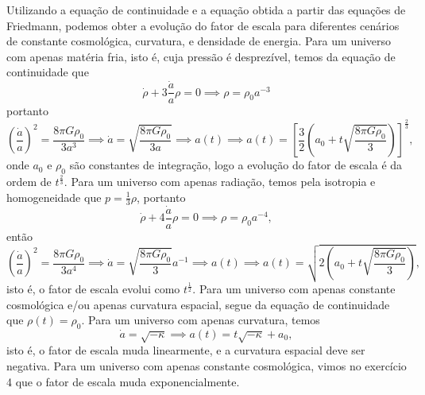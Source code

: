 Utilizando a equação de continuidade e a equação obtida a partir das equações de Friedmann, podemos obter a evolução do fator de escala para diferentes cenários de constante cosmológica, curvatura, e densidade de energia. Para um universo com apenas matéria fria, isto é, cuja pressão é desprezível, temos da equação de continuidade que
\begin{equation*}
    \dot{\rho} + 3\frac{\dot{a}}{a} \rho = 0 \implies \rho = \rho_0 a^{-3}
\end{equation*}
portanto
\begin{equation*}
    \left(\frac{\dot{a}}{a}\right)^2 = \frac{8\pi G\rho_0}{3a^3} \implies \dot{a} = \sqrt{\frac{8\pi G \rho_0}{3a}} \implies a(t) \implies a(t) = \left[\frac32 \left(a_0 + t\sqrt{\frac{8\pi G\rho_0}{3}}\right)\right]^{\frac23},
\end{equation*}
onde \(a_0\) e \(\rho_0\) são constantes de integração, logo a evolução do fator de escala é da ordem de \(t^{\frac23}\). Para um universo com apenas radiação, temos pela isotropia e homogeneidade que \(p = \frac13 \rho\), portanto
\begin{equation*}
    \dot\rho + 4 \frac{\dot{a}}{a}\rho = 0 \implies \rho = \rho_0 a^{-4},
\end{equation*}
então
\begin{equation*}
    \left(\frac{\dot{a}}{a}\right)^2 = \frac{8\pi G\rho_0}{3a^4} \implies \dot{a} = \sqrt{\frac{8\pi G \rho_0}{3}}a^{-1} \implies a(t) \implies a(t) = \sqrt{2\left(a_0 + t\sqrt{\frac{8\pi G\rho_0}{3}}\right)},
\end{equation*}
isto é, o fator de escala evolui como \(t^{\frac12}\). Para um universo com apenas constante cosmológica e/ou apenas curvatura espacial, segue da equação de continuidade que \(\rho(t) = \rho_0\). Para um universo com apenas curvatura, temos
\begin{equation*}
    \dot{a} = \sqrt{- \kappa} \implies a(t) = t\sqrt{- \kappa} + a_0,
\end{equation*}
isto é, o fator de escala muda linearmente, e a curvatura espacial deve ser negativa. Para um universo com apenas constante cosmológica, vimos no exercício 4 que o fator de escala muda exponencialmente.

